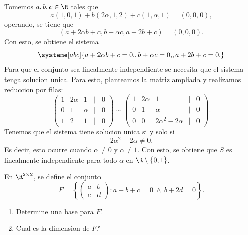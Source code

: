 \documentclass[11pt,respuestas,a4]{aleph-examen}
\begin{document}
\begin{preguntas}
\begin{respuesta}
    Tomemos $a,b,c\in\R$ tales que
    \[
        a(1,0,1) + b(2\alpha,1,2) + c(1,\alpha,1) = (0,0,0),
    \]
    operando, se tiene que
    \[
        (a + 2\alpha b + c, b + \alpha c, a + 2b + c) = (0,0,0).
    \]
    Con esto, se obtiene el sistema
    \[
        \systeme[abc]{
            a + 2\alpha b + c = 0{,},
            b + \alpha c = 0{,},
            a + 2b + c = 0{.}
        }
    \]
    Para que el conjunto sea linealmente independiente se necesita que el sistema tenga solucion unica. Para esto, planteamos la matriz ampliada y realizamos reduccion por filas:
    \[
        \begin{pmatrix}
            1 & 2\alpha & 1 & | & 0\\
            0 & 1 & \alpha & | & 0\\
            1 & 2 & 1 & | & 0
        \end{pmatrix}
        \sim
        \begin{pmatrix}
            1 & 2\alpha & 1 & | & 0\\
            0 & 1 & \alpha & | & 0\\
            0 & 0 & 2\alpha^2 -2\alpha & | & 0
        \end{pmatrix}.
    \]
    Tenemos que el sistema tiene solucion unica si y solo si
    \[
        2\alpha^2 - 2\alpha \neq 0.
    \]
    Es decir, esto ocurre cuando $\alpha\neq 0$ y $\alpha\neq 1$.
    Con esto, se obtiene que $S$ es linealmente independiente para todo $\alpha$ en $\R\setminus\{0,1\}$.\qedhere
\end{respuesta}

\item
    En $\R^{2\times2}$, se define el conjunto
    \[
        F = \left\{ \begin{pmatrix} a & b\\ c & d \end{pmatrix} : a-b+c=0\ \land\ b+2d=0 \right\}.
    \]
    \begin{enumerate}
    \item
        Determine una base para $F$.
    \item
        Cual es la dimension de $F$?
    \end{enumerate}


\end{preguntas}
\end{document}
